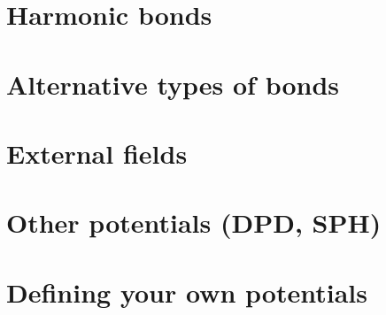 \section{Harmonic bonds}

\section{Alternative types of bonds}

\section{External fields}

\section{Other potentials (DPD, SPH)}

\section{Defining your own potentials}
